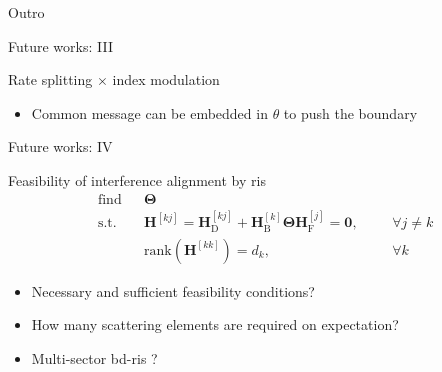 \documentclass[presentation,xcolor={table},9pt]{beamer}
\begin{document}
\begin{section}{Outro}
\begin{frame}{Future works: III}
\begin{block}{Rate splitting $\times$ index modulation}
\begin{itemize}
\begin{figure}
{{						}
					}
				\end{figure}
				\item Common message can be embedded in $\theta$ to push the boundary
			\end{itemize}
		\end{block}
	\end{frame}

	\begin{frame}{Future works: IV}
		\begin{block}{Feasibility of interference alignment by \gls{ris}}
			\begin{align*}
				&\text{find} && \mathbf{\Theta} &&&\\
				&\text{s.t.} && \mathbf{H}^{[kj]} = \mathbf{H}_\mathrm{D}^{[kj]} + \mathbf{H}_\mathrm{B}^{[k]} \mathbf{\Theta} \mathbf{H}_\mathrm{F}^{[j]} = \mathbf{0}, &&& \forall j \neq k\\
				& && \mathrm{rank}(\mathbf{H}^{[kk]}) = d_k, &&& \forall k
			\end{align*}
			\begin{itemize}
				\item Necessary and sufficient feasibility conditions?
				\item How many scattering elements are required on expectation?
				\item Multi-sector \gls{bd}-\gls{ris} \cite{Li2023c}?
			\end{itemize}
		\end{block}
	\end{frame}

\end{section}


\end{document}
